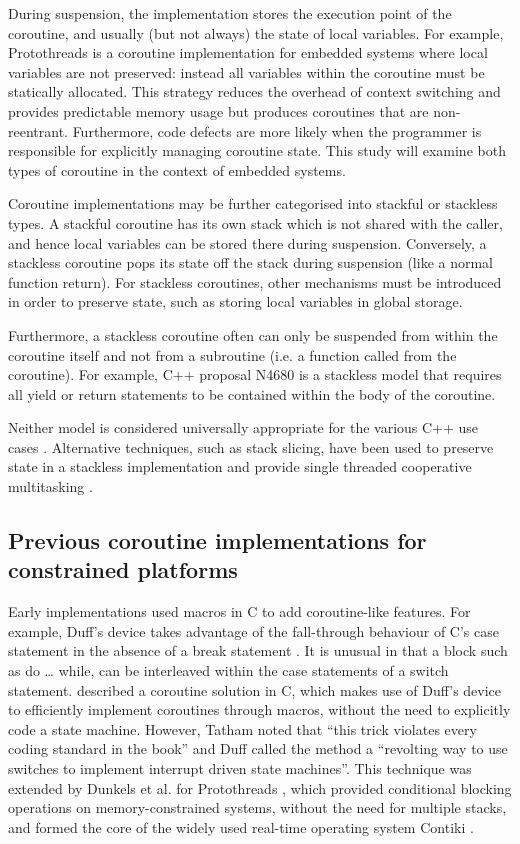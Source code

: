 During suspension, the implementation stores the execution point of the coroutine, and usually (but not always) the state of local variables. For example, Protothreads \cite{Dunkels2006} is a coroutine implementation for embedded systems where local variables are not preserved: instead all variables within the coroutine must be statically allocated. This strategy reduces the overhead of context switching and provides predictable memory usage but produces coroutines that are non-reentrant. Furthermore, code defects are more likely when the programmer is responsible for explicitly managing coroutine state. This study will examine both types of coroutine in the context of embedded systems.

Coroutine implementations may be further categorised into stackful or stackless types. A stackful coroutine has its own stack which is not shared with the caller, and hence local variables can be stored there during suspension. Conversely, a stackless coroutine pops its state off the stack during suspension (like a normal function return). For stackless coroutines, other mechanisms must be introduced in order to preserve state, such as storing local variables in global storage. 

Furthermore, a stackless coroutine often can only be suspended from within the coroutine itself and not from a subroutine (i.e. a function called from the coroutine). For example, C++ proposal N4680 is a stackless model that requires all yield or return statements to be contained within the body of the coroutine.

Neither model is considered universally appropriate for the various C++ use cases \cite{Goodspeed2014, Riegel2015}. Alternative techniques, such as stack slicing, have been used to preserve state in a stackless implementation and provide single threaded cooperative multitasking \cite{Tismer2000, Tismer2018}.

\subsection{Previous coroutine implementations for constrained platforms}
\label{previous-implementations}

Early implementations used macros in C to add coroutine-like features. For example, Duff’s device takes advantage of the fall-through behaviour of C’s case statement in the absence of a break statement \cite{Duff88}. It is unusual in that a block such as do … while, can be interleaved within the case statements of a switch statement.  described a coroutine solution in C, which makes use of Duff’s device to efficiently implement coroutines through macros, without the need to explicitly code a state machine. However, Tatham noted that “this trick violates every coding standard in the book” and Duff called the method a “revolting way to use switches to implement interrupt driven state machines”. This technique was extended by Dunkels et al. for Protothreads \cite{Dunkels2006}, which provided conditional blocking operations on memory-constrained systems, without the need for multiple stacks, and formed the core of the widely used real-time operating system Contiki \cite{Dunkels2004}.

